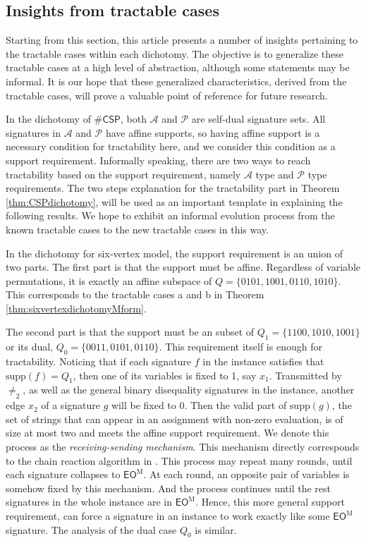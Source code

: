 \documentclass[a4paper,UKenglish,cleveref, autoref, thm-restate]{lipics-v2021}
\newcommand{\csp}[0]{\textsf{CSP}}
\newcommand{\su}[0]{\text{supp}}
\newcommand{\eom}[1][\text{M}]{\textsf{EO}^{#1}}
\begin{document}
\subsection{Insights from tractable cases}

Starting from this section, this article presents a number of insights pertaining to the tractable cases within each dichotomy. The objective is to generalize these tractable cases at a high level of abstraction, although some statements may be informal. It is our hope that these generalized characteristics, derived from the tractable cases, will prove a valuable point of reference for future research.

In the dichotomy of $\#\csp$, both  $\mathscr{A}$ and $\mathscr{P}$  are self-dual signature sets.  
All signatures in $\mathscr{A}$ and $\mathscr{P}$ have affine supports, so having affine support is a necessary condition for tractability here, and we consider this condition as a support requirement. 
Informally speaking, there are two ways to reach tractability based on the support requirement, namely $\mathscr{A}$ type and $\mathscr{P}$ type requirements.  
The two steps explanation for the tractability part in Theorem \ref{thm:CSPdichotomy}, will be used as an important template in explaining the following results. 
We hope to exhibit an informal evolution process from the known tractable cases to the new tractable cases in this way. 



In the dichotomy for six-vertex model, the support requirement is an union of two parts. The first part is that the support must be affine. Regardless of variable permutations, it is exactly an affine subspace of $Q=\{0101,1001,0110,1010\}$. This corresponds to the tractable cases a and b in Theorem \ref{thm:sixvertexdichotomyMform}.

The second part is that the support must be an subset of $Q_1=\{1100,1010,1001\}$ or its dual, $Q_0=\{0011,0101,0110\}$.
This requirement itself is enough for tractability.
Noticing that if each signature $f$ in the instance satisfies that $\su(f)=Q_1$, then one of its variables is fixed to 1, say $x_1$. 
Transmitted by $\neq_2$, as well as the general binary disequality signatures in the instance, another edge $x_2$ of a signature $g$ will be fixed to 0. 
 Then the valid part of $\su(g)$, the set of strings that can appear in an assignment with non-zero evaluation, is of size at most two and meets the affine support requirement. We denote this process as the \textit{receiving-sending mechanism}. This mechanism directly corresponds to the chain reaction algorithm in \cite{shao2024eulerian}.
This process may repeat many rounds, until each signature collapses to $\eom$. 
At each round, an opposite pair of variables is somehow fixed by this mechanism. And the process continues until the rest signatures in the whole instance are in $\eom$. Hence, this more general support requirement, can force a signature in an instance to work exactly like some $\eom$ signature. 
The analysis of the dual case $Q_0$ is similar.
\end{document}
